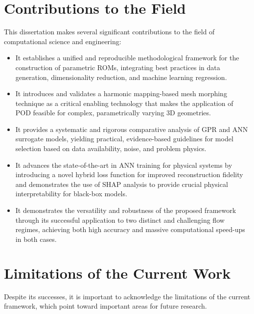 \documentclass[dscexam, EN]{ufabcFHZh}
\begin{document}
\section{Contributions to the Field}

This dissertation makes several significant contributions to the field of computational science and engineering:

\begin{itemize}
    \item It establishes a unified and reproducible methodological framework for the construction of parametric ROMs, integrating best practices in data generation, dimensionality reduction, and machine learning regression.
    \item It introduces and validates a harmonic mapping-based mesh morphing technique as a critical enabling technology that makes the application of POD feasible for complex, parametrically varying 3D geometries.
    \item It provides a systematic and rigorous comparative analysis of GPR and ANN surrogate models, yielding practical, evidence-based guidelines for model selection based on data availability, noise, and problem physics.
    \item It advances the state-of-the-art in ANN training for physical systems by introducing a novel hybrid loss function for improved reconstruction fidelity and demonstrates the use of SHAP analysis to provide crucial physical interpretability for black-box models.
    \item It demonstrates the versatility and robustness of the proposed framework through its successful application to two distinct and challenging flow regimes, achieving both high accuracy and massive computational speed-ups in both cases.
\end{itemize}


\section{Limitations of the Current Work}

Despite its successes, it is important to acknowledge the limitations of the current framework, which point toward important areas for future research.
\end{document}
